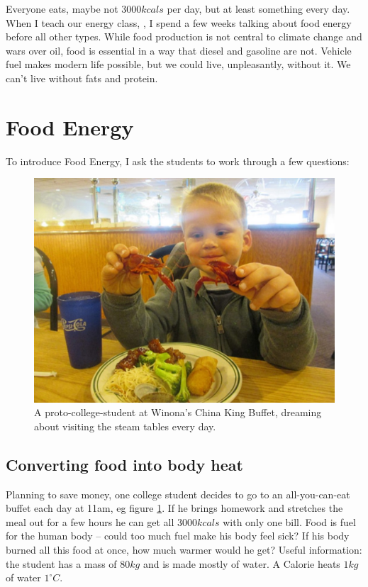 \documentclass[prb,preprint]{revtex4-2}
\begin{document}
Everyone eats, maybe not $3000 kcals$ per day, but at least something every day.  When I teach our energy class,
\cite{Energy_textbook,PFFP}, 
I spend a few weeks talking about food energy before all other types.  While food production is not central to climate change and wars over oil, food is essential in a way that diesel and gasoline are not.  Vehicle fuel makes modern life possible, but we could live, unpleasantly, without it.  We can't live without fats and protein.  

\section{Food Energy}

To introduce Food Energy, I ask the students to work through a few questions:

\begin{figure}[h]
\centering
\includegraphics[width=\columnwidth]{at_the_buffet.jpg}
\caption{
A proto-college-student at Winona's China King Buffet, dreaming about visiting the steam tables every day. 
}
\label{buffet}
\end{figure}

\subsection{Converting food into body heat}
Planning to save money, one college student decides to go to an all-you-can-eat buffet each day at 11am, eg figure \ref{buffet}.  If he brings homework and stretches the meal out for a few hours he can get all $3000kcals$ with only one bill.  Food is fuel for the human body -- could too much fuel make his body feel sick? If his body burned all this food at once, how much warmer would he get? 
Useful information: the student has a mass of $80kg$ and is made mostly of water.  A Calorie heats $1 kg$ of water $1^{\circ}C$. 
\end{document}

